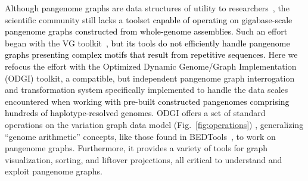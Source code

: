 \documentclass{bioinfo}
\newcommand{\REVIEWED}[1]{{\textcolor{Black}{#1}}}
\begin{document}
Although \REVIEWED{pangenome graphs} are data structures of utility to researchers~\citep{cpang2018,Garrison:2018,Baaijens_2019,Hickey:2020,Sibbesen_2021}, the scientific community still lacks a toolset \REVIEWED{capable of operating on gigabase-scale pangenome graphs constructed from whole-genome assemblies}.
Such an effort began with the VG toolkit~\citep{Garrison:2018}\REVIEWED{, but its tools do not efficiently handle pangenome graphs presenting complex motifs that result from repetitive sequences.}
Here we refocus the effort with the Optimized Dynamic Genome/Graph Implementation (ODGI) toolkit, a compatible, but independent pangenome graph interrogation and transformation system specifically implemented to handle the data scales encountered when working \REVIEWED{with pre-built constructed pangenomes comprising hundreds of haplotype-resolved genomes.}
ODGI offers a set of standard operations on the variation graph data model (Fig.~\ref{fig:operations}) , generalizing ``genome arithmetic'' concepts, like those found in BEDTools~\citep{Quinlan_2010}, to work on pangenome graphs.
Furthermore, it provides a variety of tools for graph visualization, sorting, and liftover projections, all critical to understand and exploit pangenome graphs.


\end{document}
